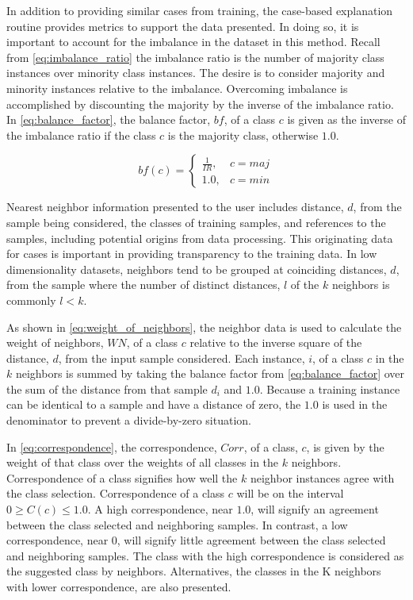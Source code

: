 In addition to providing similar cases from training, the case-based explanation
routine provides metrics to support the data presented. In doing so, it is
important to account for the imbalance in the dataset in this method. Recall
from \eqref{eq:imbalance_ratio} the imbalance ratio is the number of majority
class instances over minority class instances. The desire is to consider
majority and minority instances relative to the imbalance. Overcoming imbalance
is accomplished by discounting the majority by the inverse of the imbalance
ratio. In \eqref{eq:balance_factor}, the balance factor, $bf$, of a class $c$ is
given as the inverse of the imbalance ratio if the class $c$ is the majority
class, otherwise $1.0$.

\begin{equation}\label{eq:balance_factor}
    bf(c) = 
    \begin{cases}
    \frac{1}{IR},& c = maj\\
    1.0,& c = min
    \end{cases}
\end{equation}

Nearest neighbor information presented to the user includes distance, $d$, from
the sample being considered, the classes of training samples, and references to
the samples, including potential origins from data processing. This originating
data for cases is important in providing transparency to the training data. In
low dimensionality datasets, neighbors tend to be grouped at coinciding
distances, $d$, from the sample where the number of distinct distances, $l$ of
the $k$ neighbors is commonly $l < k$.

As shown in \eqref{eq:weight_of_neighbors}, the neighbor data is used to
calculate the weight of neighbors, $WN$, of a class $c$ relative to the inverse
square of the distance, $d$, from the input sample considered. Each instance,
$i$, of a class $c$ in the $k$ neighbors is summed by taking the balance factor
from \eqref{eq:balance_factor} over the sum of the distance from that sample
$d_i$ and $1.0$. Because a training instance can be identical to a sample and
have a distance of zero, the $1.0$ is used in the denominator to prevent a
divide-by-zero situation. 

In \eqref{eq:correspondence}, the correspondence, $Corr$, of a class, $c$, is
given by the weight of that class over the weights of all classes in the $k$
neighbors. Correspondence of a class signifies how well the $k$ neighbor
instances agree with the class selection. Correspondence of a class $c$ will be
on the interval $0 \ge C(c) \le 1.0$. A high correspondence, near $1.0$, will
signify an agreement between the class selected and neighboring samples. In
contrast, a low correspondence, near 0, will signify little agreement between
the class selected and neighboring samples. The class with the high
correspondence is considered as the suggested class by neighbors. Alternatives,
the classes in the K neighbors with lower correspondence, are also presented.

